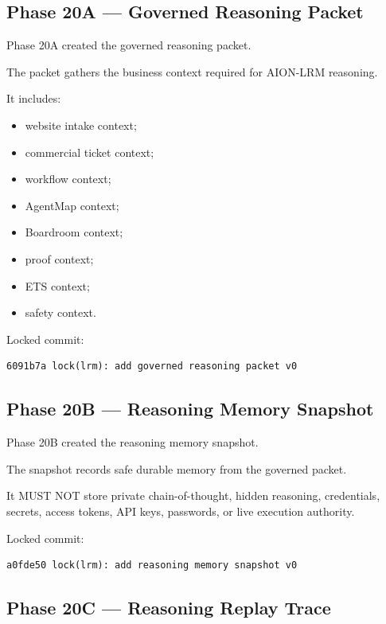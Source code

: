 \subsection{Phase 20A --- Governed Reasoning Packet}

Phase 20A created the governed reasoning packet.

The packet gathers the business context required for AION-LRM reasoning.

It includes:

\begin{itemize}
  \item website intake context;
  \item commercial ticket context;
  \item workflow context;
  \item AgentMap context;
  \item Boardroom context;
  \item proof context;
  \item ETS context;
  \item safety context.
\end{itemize}

Locked commit:

\begin{verbatim}
6091b7a lock(lrm): add governed reasoning packet v0
\end{verbatim}

\subsection{Phase 20B --- Reasoning Memory Snapshot}

Phase 20B created the reasoning memory snapshot.

The snapshot records safe durable memory from the governed packet.

It MUST NOT store private chain-of-thought, hidden reasoning, credentials, secrets, access tokens, API keys, passwords, or live execution authority.

Locked commit:

\begin{verbatim}
a0fde50 lock(lrm): add reasoning memory snapshot v0
\end{verbatim}

\subsection{Phase 20C --- Reasoning Replay Trace}

